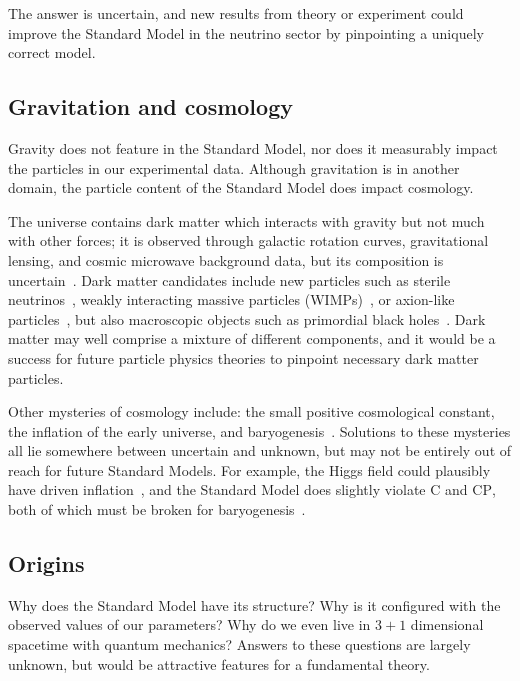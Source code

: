 The answer is uncertain, and new results from theory or experiment could
improve the Standard Model in the neutrino sector
by pinpointing a uniquely correct model.


\subsection{Gravitation and cosmology}
Gravity does not feature in the Standard Model, nor does it measurably impact
the particles in our experimental data.
Although gravitation is in another domain, the particle content of the
Standard Model does impact cosmology.

The universe contains dark matter which interacts with gravity but not much
with other forces; it is observed through galactic rotation curves,
gravitational lensing, and cosmic microwave background data,
but its composition is uncertain~\cite{
begeman1991rotation,
garrett2010dark,
planck2020results
}.
Dark matter candidates include new particles such as
sterile neutrinos~\cite{boyarsky2019sterile},
weakly interacting massive particles (WIMPs)~\cite{jungman1996wimp},
or
axion-like particles~\cite{kim2008axions},
but also macroscopic objects such as
primordial black holes~\cite{bernard2019primordial}.
Dark matter may well comprise a mixture of different components, and it would
be a success for future particle physics theories to pinpoint necessary dark
matter particles.

Other mysteries of cosmology include:
the small positive cosmological constant,
the inflation of the early universe,
and baryogenesis~\cite{
wells2020discovery,
riess1998observational
}.
Solutions to these mysteries all lie somewhere between uncertain and unknown,
but may not be entirely out of reach for future Standard Models.
For example, the Higgs field could plausibly have driven
inflation~\cite{bezrukov2008higgs},
and the Standard Model does slightly violate $\mathrm{C}$ and $\mathrm{CP}$,
both of which must be broken for baryogenesis~\cite{sakharov1991re}.


\subsection{Origins}
Why does the Standard Model have its structure?
Why is it configured with the observed values of our parameters?
Why do we even live in $3+1$ dimensional spacetime with quantum mechanics?
Answers to these questions are largely unknown, but would be
attractive features for a fundamental theory.


